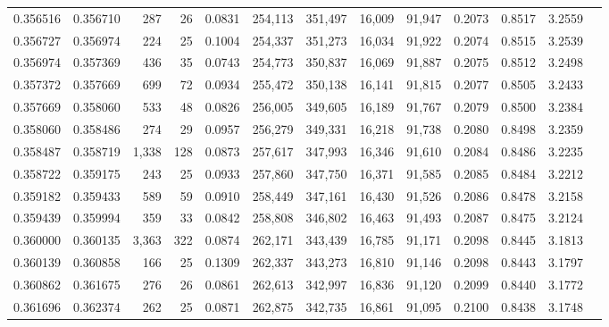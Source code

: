 \begin{tabular}{rrrrrrrrrrrrr}
0.356516 & 0.356710 &   287 &  26 &                                     0.0831 & 254,113 & 351,497 &  16,009 &  91,947 & 0.2073 & 0.8517 & 3.2559 \\
0.356727 & 0.356974 &   224 &  25 &                                     0.1004 & 254,337 & 351,273 &  16,034 &  91,922 & 0.2074 & 0.8515 & 3.2539 \\
0.356974 & 0.357369 &   436 &  35 &                                     0.0743 & 254,773 & 350,837 &  16,069 &  91,887 & 0.2075 & 0.8512 & 3.2498 \\
0.357372 & 0.357669 &   699 &  72 &                                     0.0934 & 255,472 & 350,138 &  16,141 &  91,815 & 0.2077 & 0.8505 & 3.2433 \\
0.357669 & 0.358060 &   533 &  48 &                                     0.0826 & 256,005 & 349,605 &  16,189 &  91,767 & 0.2079 & 0.8500 & 3.2384 \\
0.358060 & 0.358486 &   274 &  29 &                                     0.0957 & 256,279 & 349,331 &  16,218 &  91,738 & 0.2080 & 0.8498 & 3.2359 \\
0.358487 & 0.358719 & 1,338 & 128 &                                     0.0873 & 257,617 & 347,993 &  16,346 &  91,610 & 0.2084 & 0.8486 & 3.2235 \\
0.358722 & 0.359175 &   243 &  25 &                                     0.0933 & 257,860 & 347,750 &  16,371 &  91,585 & 0.2085 & 0.8484 & 3.2212 \\
0.359182 & 0.359433 &   589 &  59 &                                     0.0910 & 258,449 & 347,161 &  16,430 &  91,526 & 0.2086 & 0.8478 & 3.2158 \\
0.359439 & 0.359994 &   359 &  33 &                                     0.0842 & 258,808 & 346,802 &  16,463 &  91,493 & 0.2087 & 0.8475 & 3.2124 \\
0.360000 & 0.360135 & 3,363 & 322 &                                     0.0874 & 262,171 & 343,439 &  16,785 &  91,171 & 0.2098 & 0.8445 & 3.1813 \\
0.360139 & 0.360858 &   166 &  25 &                                     0.1309 & 262,337 & 343,273 &  16,810 &  91,146 & 0.2098 & 0.8443 & 3.1797 \\
0.360862 & 0.361675 &   276 &  26 &                                     0.0861 & 262,613 & 342,997 &  16,836 &  91,120 & 0.2099 & 0.8440 & 3.1772 \\
0.361696 & 0.362374 &   262 &  25 &                                     0.0871 & 262,875 & 342,735 &  16,861 &  91,095 & 0.2100 & 0.8438 & 3.1748 \\

\end{tabular}
